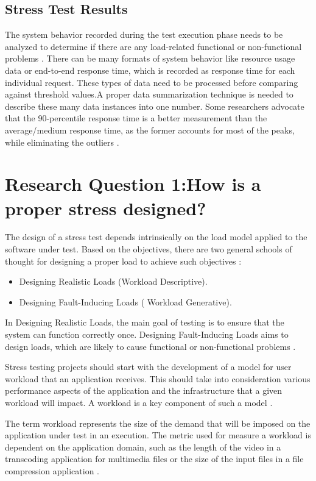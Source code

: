 \subsection{Stress Test Results}

The system behavior recorded during the test execution phase needs to be analyzed to determine if there are any load-related functional or non-functional problems \cite{Jiang2010}. There can be many formats of system behavior like resource usage data or end-to-end response time, which is recorded as response time for each individual request. These types of data need to be processed before comparing against threshold values.A proper data summarization technique is needed to describe these many data instances into one number. Some researchers advocate that the 90-percentile response time is a better measurement than the average/medium response time, as the former accounts for most of the peaks, while eliminating the outliers \cite{Jiang2010}.

\section{Research Question 1:How is a proper stress designed?}

The design of a stress test depends intrinsically on the load model applied to the software under test. Based on the objectives, there are two general schools of thought for designing a proper load to achieve such objectives \cite{Afzal2009a}:

\begin{itemize}
\item Designing Realistic Loads (Workload Descriptive). 
\item Designing Fault-Inducing Loads ( Workload Generative).
\end{itemize}

In Designing Realistic Loads, the main goal of testing is to ensure that the system can function correctly once. Designing Fault-Inducing Loads  aims to design loads, which are likely to cause functional or non-functional problems \cite{Afzal2009a}.

Stress testing projects should start with the development of a model for user workload that an application receives. This should take into consideration various performance aspects of the application and the infrastructure that a given workload will impact. A workload is a key component of such a model \cite{Molyneaux2009}.

The term workload represents the size of the demand that will be imposed on the application under test in an execution. The metric  used for measure a workload is dependent on the application domain, such as the length of the video in a transcoding application for multimedia files or the size of the input files in a file compression application \cite{Feitelson2013} \cite{Molyneaux2009} \cite{Goncalves2014}. 

